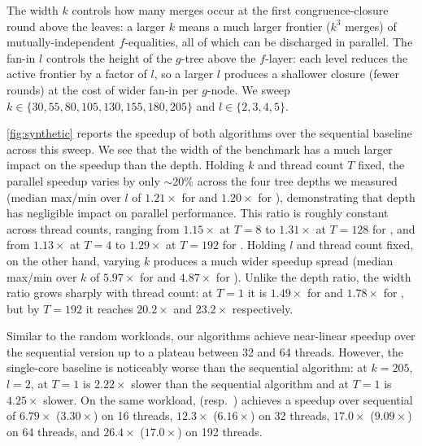 The width $k$ controls how many merges occur at the first congruence-closure
round above the leaves: a larger $k$ means a much larger frontier ($k^3$
merges) of mutually-independent $f$-equalities, all of which can be discharged
in parallel. The fan-in $l$ controls the height of the $g$-tree above the
$f$-layer: each level reduces the active frontier by a factor of $l$, so a
larger $l$ produces a shallower closure (fewer rounds) at the cost of wider
fan-in per $g$-node. We sweep $k \in \{30, 55, 80, 105, 130, 155, 180, 205\}$
and $l \in \{2, 3, 4, 5\}$.

\autoref{fig:synthetic} reports the speedup of both algorithms over the
sequential baseline across this sweep.
We see that the width of the benchmark has a much larger impact on the speedup
than the depth. Holding $k$ and thread count $T$ fixed, the parallel
speedup varies by only $\sim$20\% across the four tree depths we measured
(median max/min over $l$ of $1.21\times$ for \filteralgo and $1.20\times$ for
\parentalgo), demonstrating that depth has negligible impact on parallel
performance. This ratio is roughly constant across thread counts, ranging from
$1.15\times$ at $T{=}8$ to $1.31\times$ at $T{=}128$ for \filteralgo, and from
$1.13\times$ at $T{=}4$ to $1.29\times$ at $T{=}192$ for \parentalgo. Holding
$l$ and thread count fixed, on the other hand, varying $k$ produces a much wider
speedup spread (median max/min over $k$ of $5.97\times$ for \filteralgo and
$4.87\times$ for \parentalgo). Unlike the depth ratio, the width ratio grows
sharply with thread count: at $T{=}1$ it is $1.49\times$ for \filteralgo and
$1.78\times$ for \parentalgo, but by $T{=}192$ it reaches $20.2\times$ and
$23.2\times$ respectively.

Similar to the random workloads, our algorithms achieve near-linear speedup
over the sequential version up to a plateau between 32 and 64 threads.
However, the single-core baseline is noticeably worse than the sequential
algorithm: at $k{=}205$, $l{=}2$, \filteralgo at $T{=}1$ is $2.22\times$
slower than the sequential algorithm and \parentalgo at $T{=}1$ is
$4.25\times$ slower. On the same workload, \filteralgo (resp.\ \parentalgo)
achieves a speedup over sequential of $6.79\times$ ($3.30\times$) on 16
threads, $12.3\times$ ($6.16\times$) on 32 threads, $17.0\times$
($9.09\times$) on 64 threads, and $26.4\times$ ($17.0\times$) on 192
threads.




